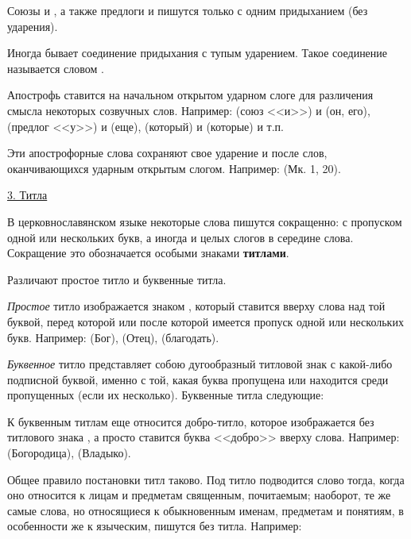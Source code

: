 \documentclass[11pt,a4paper,oneside]{memoir}
\begin{document}
    Союзы {} и {}, а также предлоги {} и {} пишутся только с одним придыханием (без ударения).
    
    Иногда бывает соединение придыхания с тупым ударением. Такое соединение называется словом {}.
    
    Апострофь ставится на начальном открытом ударном слоге для различения смысла некоторых созвучных слов. Например: {} (союз <<и>>) и {} (он, его), {} (предлог <<у>>) и {} (еще), {} (который) и {} (которые) и т.п.

    Эти апострофорные слова сохраняют свое ударение и после слов, оканчивающихся ударным открытым слогом. Например: {} (Мк. 1, 20).
    
    \medskip
    \underline{3. Титла}
    \medskip
    
    В церковнославянском языке некоторые слова пишутся сокращенно: с пропуском одной или нескольких букв, а иногда и целых слогов в середине слова. Сокращение это обозначается особыми знаками \textbf{титлами}.
    
    Различают простое титло и буквенные титла.
    
    \emph{Простое} титло изображается знаком {}, который ставится вверху слова над той буквой, перед которой или после которой имеется пропуск одной или нескольких букв. Например: {} (Бог), {} (Отец), {} (благодать).
    
    \emph{Буквенное} титло представляет собою дугообразный титловой знак {} с какой-либо подписной буквой, именно с той, какая буква пропущена или находится среди пропущенных (если их несколько). Буквенные титла следующие:

    \bigskip{}

    К буквенным титлам еще относится добро-титло, которое изображается без титлового знака {}, а просто ставится буква <<добро>> вверху слова. Например: {} (Богородица), {} (Владыко).
    
    Общее правило постановки титл таково. Под титло подводится слово тогда, когда оно относится к лицам и предметам священным, почитаемым; наоборот, те же самые слова, но относящиеся к обыкновенным именам, предметам и понятиям, в особенности же к языческим, пишутся без титла. Например:
\end{document}
